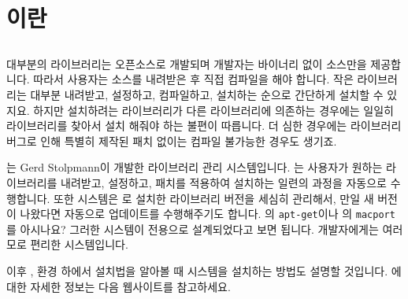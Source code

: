 \section{\OCAML{}이란}\label{sec:ocaml}


\subsection{\FINDLIB{}}


\subsection{\GODI{}}

대부분의 \OCAML{} 라이브러리는 오픈소스로 개발되며 개발자는 바이너리 없이
소스만을 제공합니다. 따라서 사용자는 소스를 내려받은 후 직접 컴파일을 해야
합니다. 작은 라이브러리는 대부분 내려받고, 설정하고, 컴파일하고, 설치하는
순으로 간단하게 설치할 수 있지요. 하지만 설치하려는 라이브러리가 다른
\OCAML{} 라이브러리에 의존하는 경우에는 일일히 라이브러리를 찾아서 설치
해줘야 하는 불편이 따릅니다. 더 심한 경우에는 라이브러리 버그로 인해 특별히
제작된 패치 없이는 컴파일 불가능한 경우도 생기죠.

\GODI{}는 Gerd Stolpmann이 개발한 \OCAML{} 라이브러리 관리
시스템입니다. \GODI{}는 사용자가 원하는 라이브러리를 내려받고, 설정하고,
패치를 적용하여 설치하는 일련의 과정을 자동으로 수행합니다. 또한 \GODI{}
시스템은 \GODI{}로 설치한 라이브러리 버전을 세심히 관리해서, 만일 새 버전이
나왔다면 자동으로 업데이트를 수행해주기도 합니다. \UBUNTU{}의
\texttt{apt-get}이나 \MAC{}의 \texttt{macport}를 아시나요? 그러한 시스템이
\OCAML{} 전용으로 설계되었다고 보면 됩니다. \OCAML{} 개발자에게는 여러모로
편리한 시스템입니다.

이후 \LINUX{}, \MAC{} 환경 하에서 설치법을 알아볼 때 \GODI{} 시스템을 설치하는
방법도 설명할 것입니다. \GODI{}에 대한 자세한 정보는 다음 웹사이트를 참고하세요.

\begin{center}
\end{center}


